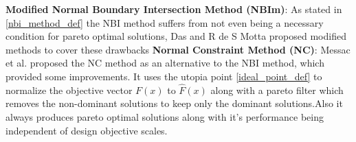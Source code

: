 \newline\newline \textbf{Modified Normal Boundary Intersection Method (NBIm)}: \label{nbim_method_def} As stated in \ref{nbi_method_def} the NBI method suffers from not even being a necessary condition for pareto optimal solutions, Das \cite{das1999improved} and R de S Motta \cite{de2012modified} proposed modified methods to cover these drawbacks
\newline\newline \textbf{Normal Constraint Method (NC)}: \label{nc_method_def} Messac et al. \cite{messac2003normalized}\cite{messac2004normal} proposed the NC method as an alternative to the NBI method, which provided some improvements. It uses the utopia point \ref{ideal_point_def} to normalize the objective vector $F(x)$ to $\hat{F}(x)$ along with a pareto filter which removes the non-dominant solutions to keep only the dominant solutions.Also it always produces pareto optimal solutions along with it's performance being independent of design objective scales. 

